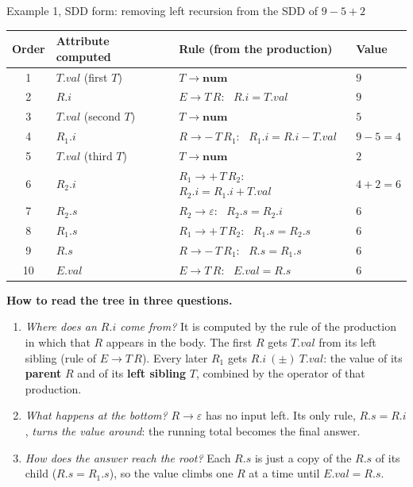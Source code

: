 \documentclass[11pt,a4paper]{article}
\begin{document}
\begin{examplebox}{Example 1, SDD form: removing left recursion from the SDD of $9-5+2$}
\begin{center}
\small
\begin{tabular}{@{}c l l l@{}}
\toprule
\textbf{Order} & \textbf{Attribute computed} & \textbf{Rule (from the production)} & \textbf{Value} \\ \midrule
1 & $T.val$ (first $T$) & $T\to\mathbf{num}$ & $9$ \\
2 & $R.i$ & $E\to T\,R$: \ $R.i=T.val$ & $9$ \\
3 & $T.val$ (second $T$) & $T\to\mathbf{num}$ & $5$ \\
4 & $R_1.i$ & $R\to -\,T\,R_1$: \ $R_1.i=R.i-T.val$ & $9-5=4$ \\
5 & $T.val$ (third $T$) & $T\to\mathbf{num}$ & $2$ \\
6 & $R_2.i$ & $R_1\to +\,T\,R_2$: \ $R_2.i=R_1.i+T.val$ & $4+2=6$ \\
7 & $R_2.s$ & $R_2\to\varepsilon$: \ $R_2.s=R_2.i$ & $6$ \\
8 & $R_1.s$ & $R_1\to +\,T\,R_2$: \ $R_1.s=R_2.s$ & $6$ \\
9 & $R.s$ & $R\to -\,T\,R_1$: \ $R.s=R_1.s$ & $6$ \\
10 & $E.val$ & $E\to T\,R$: \ $E.val=R.s$ & $6$ \\ \bottomrule
\end{tabular}
\end{center}
\textbf{How to read the tree in three questions.}
\begin{enumerate}[nosep]
\item \emph{Where does an $R.i$ come from?} It is computed by the rule of the production in which that $R$ appears in the body. The first $R$ gets $T.val$ from its left sibling (rule of $E\to T\,R$). Every later $R_1$ gets $R.i\ (\pm)\ T.val$: the value of its \textbf{parent} $R$ and of its \textbf{left sibling} $T$, combined by the operator of that production.
\item \emph{What happens at the bottom?} $R\to\varepsilon$ has no input left. Its only rule, $R.s=R.i$, \emph{turns the value around}: the running total becomes the final answer.
\item \emph{How does the answer reach the root?} Each $R.s$ is just a copy of the $R.s$ of its child ($R.s=R_1.s$), so the value climbs one $R$ at a time until $E.val=R.s$.
\end{enumerate}
\end{examplebox}
\end{document}

